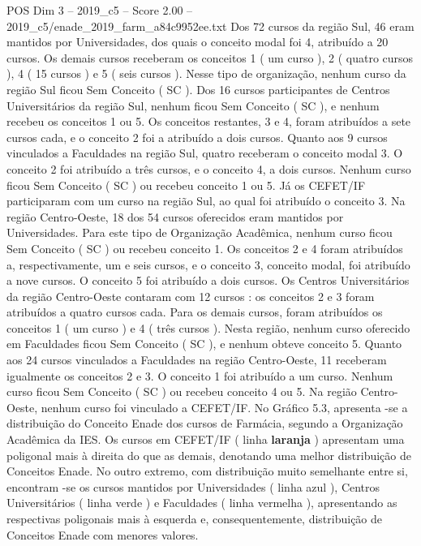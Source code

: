 \begin{textsample}{POS Dim 3 – 2019\_c5 – Score 2.00 – 2019\_c5/enade\_2019\_farm\_a84c9952ee.txt}
Dos 72 cursos da região Sul, 46 eram mantidos por Universidades, dos quais o conceito modal foi 4, atribuído a 20 cursos.
Os demais cursos receberam os conceitos 1 ( um curso ), 2 ( quatro cursos ), 4 ( 15 cursos ) e 5 ( seis cursos ).
Nesse tipo de organização, nenhum curso da região Sul ficou Sem Conceito ( SC ).
Dos 16 cursos participantes de Centros Universitários da região Sul, nenhum ficou Sem Conceito ( SC ), e nenhum recebeu os conceitos 1 ou 5.
Os conceitos restantes, 3 e 4, foram atribuídos a sete cursos cada, e o conceito 2 foi a atribuído a dois cursos.
Quanto aos 9 cursos vinculados a Faculdades na região Sul, quatro receberam o conceito modal 3.
O conceito 2 foi atribuído a três cursos, e o conceito 4, a dois cursos.
Nenhum curso ficou Sem Conceito ( SC ) ou recebeu conceito 1 ou 5.
Já os CEFET/IF participaram com um curso na região Sul, ao qual foi atribuído o conceito 3.
Na região Centro-Oeste, 18 dos 54 cursos oferecidos eram mantidos por Universidades.
Para este tipo de Organização Acadêmica, nenhum curso ficou Sem Conceito ( SC ) ou recebeu conceito 1.
Os conceitos 2 e 4 foram atribuídos a, respectivamente, um e seis cursos, e o conceito 3, conceito modal, foi atribuído a nove cursos.
O conceito 5 foi atribuído a dois cursos.
Os Centros Universitários da região Centro-Oeste contaram com 12 cursos : os conceitos 2 e 3 foram atribuídos a quatro cursos cada.
Para os demais cursos, foram atribuídos os conceitos 1 ( um curso ) e 4 ( três cursos ).
Nesta região, nenhum curso oferecido em Faculdades ficou Sem Conceito ( SC ), e nenhum obteve conceito 5.
Quanto aos 24 cursos vinculados a Faculdades na região Centro-Oeste, 11 receberam igualmente os conceitos 2 e 3.
O conceito 1 foi atribuído a um curso.
Nenhum curso ficou Sem Conceito ( SC ) ou recebeu conceito 4 ou 5.
Na região Centro-Oeste, nenhum curso foi vinculado a CEFET/IF.
No Gráfico 5.3, apresenta -se a distribuição do Conceito Enade dos cursos de Farmácia, segundo a Organização Acadêmica da IES.
Os cursos em CEFET/IF ( linha \textbf{laranja} ) apresentam uma poligonal mais à direita do que as demais, denotando uma melhor distribuição de Conceitos Enade.
No outro extremo, com distribuição muito semelhante entre si, encontram -se os cursos mantidos por Universidades ( linha azul ), Centros Universitários ( linha verde ) e Faculdades ( linha vermelha ), apresentando as respectivas poligonais mais à esquerda e, consequentemente, distribuição de Conceitos Enade com menores valores.

\end{textsample}

